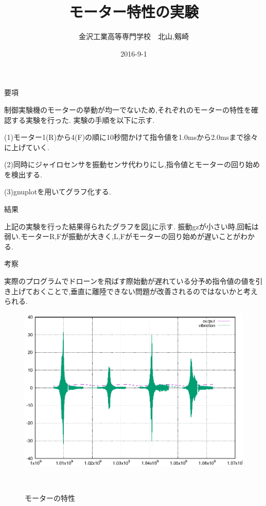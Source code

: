 \documentclass[11pt]{jsarticle}
\title{モーター特性の実験}
\author{金沢工業高等専門学校　北山,剱崎}
\date{2016-9-1}
\begin{document}
\maketitle


要項

制御実験機のモーターの挙動が均一でないため,それぞれのモーターの特性を確認する実験を行った.
実験の手順を以下に示す.

(1)モーター1(R)から4(F)の順に10秒間かけて指令値を1.0msから2.0msまで徐々に上げていく.

(2)同時にジャイロセンサを振動センサ代わりにし,指令値とモーターの回り始めを検出する.

(3)gnuplotを用いてグラフ化する.


結果

上記の実験を行った結果得られたグラフを図\ref{fig:chara}に示す.
振動gzが小さい時,回転は弱い.モーターR,Fが振動が大きく,L,Fがモーターの回り始めが遅いことがわかる.


考察

実際のプログラムでドローンを飛ばす際始動が遅れている分予め指令値の値を引き上げておくことで,垂直に離陸できない問題が改善されるのではないかと考えられる.


\begin{figure}[b]
 \begin{center}
  \includegraphics[width=130mm]{motor_chara.eps}
 　\caption{モーターの特性}
 　\label{fig:chara}
 \end{center}
\end{figure}

\end{document}
